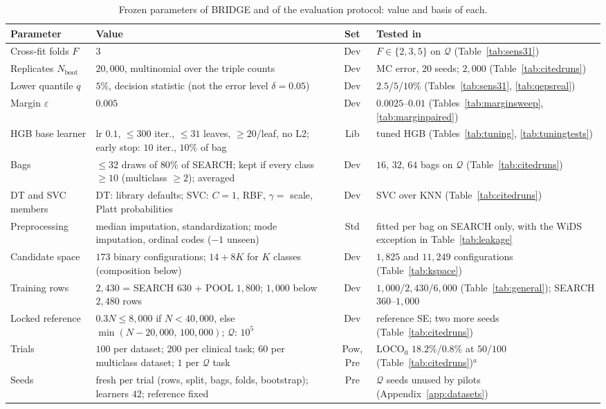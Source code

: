 \begin{table}[!t]
\centering
\scriptsize\renewcommand{\arraystretch}{0.95}
\setlength{\tabcolsep}{2.15pt}
\caption{Frozen parameters of BRIDGE and of the evaluation protocol: value and basis of each.}
\label{tab:hyperbasis}
\begin{tabularx}{\textwidth}{@{}llc>{\raggedright\arraybackslash}X@{}}
\toprule
Parameter & Value & Set & Tested in \\
\midrule
Cross-fit folds $F$ & $3$ & Dev & $F\in\{2,3,5\}$ on $\mathcal{Q}$ (Table~\ref{tab:sens31}) \\
Replicates $N_{\mathrm{boot}}$ & $20{,}000$, multinomial over the triple counts & Dev & MC error, $20$ seeds; $2{,}000$ (Table~\ref{tab:citedruns}) \\
Lower quantile $q$ & $5\%$, decision statistic (not the error level $\delta=0.05$) & Dev & $2.5$/$5$/$10\%$ (Tables~\ref{tab:sens31}, \ref{tab:qepsreal}) \\
Margin $\varepsilon$ & $0.005$ & Dev & $0.0025$--$0.01$ (Tables~\ref{tab:marginsweep}, \ref{tab:marginpaired}) \\
HGB base learner & lr $0.1$, $\le300$ iter., $\le31$ leaves, $\ge20$/leaf, no L2; early stop: $10$ iter., $10\%$ of bag & Lib & tuned HGB (Tables~\ref{tab:tuning}, \ref{tab:tuningtests}) \\
Bags & $\le32$ draws of $80\%$ of SEARCH; kept if every class $\ge10$ (multiclass $\ge2$); averaged & Dev & $16$, $32$, $64$ bags on $\mathcal{Q}$ (Table~\ref{tab:citedruns}) \\
DT and SVC members & DT: library defaults; SVC: $C=1$, RBF, $\gamma=$ scale, Platt probabilities & Dev & SVC over KNN (Table~\ref{tab:citedruns}) \\
Preprocessing & median imputation, standardization; mode imputation, ordinal codes ($-1$ unseen) & Std & fitted per bag on SEARCH only, with the WiDS exception in Table~\ref{tab:leakage} \\
Candidate space & $173$ binary configurations; $14+8K$ for $K$ classes (composition below) & Dev & $1{,}825$ and $11{,}249$ configurations (Table~\ref{tab:kspace}) \\
Training rows & $2{,}430$ = SEARCH $630$ + POOL $1{,}800$; $1{,}000$ below $2{,}480$ rows & Dev & $1{,}000$/$2{,}430$/$6{,}000$ (Table~\ref{tab:general}); SEARCH $360$--$1{,}000$ \\
Locked reference & $0.3N\le8{,}000$ if $N<40{,}000$, else $\min(N{-}20{,}000,\,100{,}000)$; $\mathcal{Q}$: $10^5$ & Dev & reference SE; two more seeds (Table~\ref{tab:citedruns}) \\
Trials & $100$ per dataset; $200$ per clinical task; $60$ per multiclass dataset; $1$ per $\mathcal{Q}$ task & Pow, Pre & LOCO$_0$ $18.2\%$/$0.8\%$ at $50$/$100$ (Table~\ref{tab:citedruns})$^{a}$ \\
Seeds & fresh per trial (rows, split, bags, folds, bootstrap); learners $42$; reference fixed & Pre & $\mathcal{Q}$ seeds unused by pilots (Appendix~\ref{app:datasets}) \\
\bottomrule
\end{tabularx}


\end{table}
